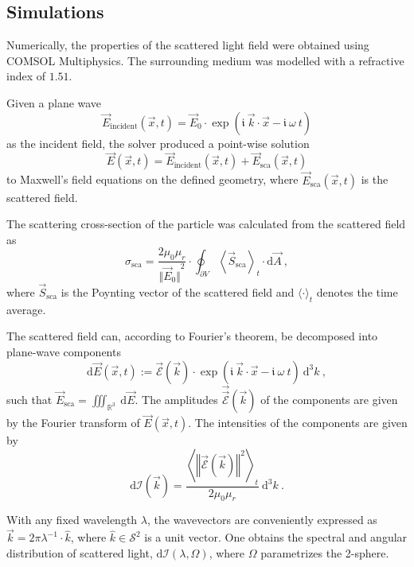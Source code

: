 \documentclass[10pt]{article}
\begin{document}
\begin{multicols}{2}
\section*{Simulations}
Numerically, the properties of the scattered light field were obtained using COMSOL Multiphysics. 
The surrounding medium was modelled with a refractive index of $1.51$. 

Given a plane wave 
$$
    \vec{E}_\mathrm{incident}(\vec{x},t) = \vec{E}_0 \cdot \exp\!\left( \mathfrak{i}\ \vec{k}\cdot\vec{x} - \mathfrak{i}\ \omega\ t \right)
$$
as the incident field, the solver produced a point-wise solution 
$$
    \vec{E}(\vec{x},t) = \vec{E}_\mathrm{incident}(\vec{x},t) + \vec{E}_\mathrm{sca}(\vec{x},t)
$$ 
to Maxwell's field equations on the defined geometry, where $\vec{E}_\mathrm{sca}(\vec{x},t)$ is the scattered field. 

The scattering cross-section of the particle was calculated from the scattered field as 
$$
    \sigma_\mathrm{sca} = \frac{2 \mu_0 \mu_r}{ {\bigl\Vert \vec{E}_0 \bigr\Vert}^2 } \cdot \oint_{\partial V} {\left\langle \vec{S}_\mathrm{sca} \right\rangle}_t \cdot\mathrm{d}\vec{A} \ ,
$$
where $\vec{S}_\mathrm{sca}$ is the Poynting vector of the scattered field and $\langle\cdot\rangle_t$ denotes the time average. 

The scattered field can, according to Fourier's theorem, be decomposed into plane-wave components
$$
    \mathrm{d}\vec{E}(\vec{x},t) := \vec{\mathcal{E}}(\vec{k}) 
    \cdot 
    \exp{\!\left(\mathfrak{i}\ \vec{k}\cdot\vec{x} - \mathfrak{i}\ \omega\ t \right)}
    \ \mathrm{d}^3 k
    \ , 
$$
such that $ \vec{E}_\mathrm{sca} = \iiint_{\mathds{R}^3}\ \mathrm{d}\vec{E}$. 
The amplitudes $\vec{\vec{\mathcal{E}}}(\vec{k})$ of the components are given by the Fourier transform of $\vec{E}(\vec{x},t)$. 
The intensities of the components are given by 
$$
    \mathrm{d}\mathcal{I}(\vec{k}) = \frac{ \left\langle {\left\Vert \vec{\mathcal{E}}(\vec{k}) \right\Vert}^2 \right\rangle_t }{ 2\mu_0 \mu_r } \ \mathrm{d}^3k
    \ .
$$

With any fixed wavelength $\lambda$, the wavevectors are conveniently expressed as $ \vec{k} = 2 \pi \lambda^{-1} \cdot \hat{k} $, where \mbox{$\hat{k} \in \mathcal{S}^2$} is a unit vector. 
One obtains the spectral and angular distribution of scattered light, $\mathrm{d}\mathcal{I}(\lambda, \Omega)$, where $\Omega$ parametrizes the 2-sphere. 




\end{multicols}
\end{document}
